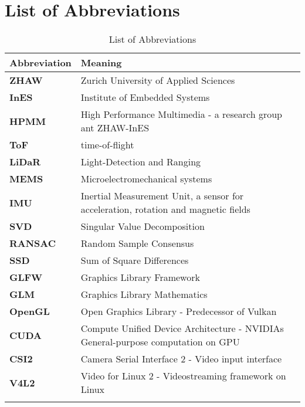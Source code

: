 \chapter*{List of Abbreviations}\label{sec:Glossar}

\begin{longtable}{|m{3cm}|m{11cm}|}	
	\rowcolor{gray} \textbf{Abbreviation}&
	Meaning \\ \hline	
	
	\textbf{ZHAW}&
	Zurich University of Applied Sciences \\ \hline	
	
	\textbf{InES}&
	Institute of Embedded Systems \\ \hline
	
	\textbf{HPMM}&
	High Performance Multimedia - a research group ant ZHAW-InES \\ \hline

	\textbf{ToF}&
	time-of-flight \\ \hline
	
	\textbf{LiDaR}&
	Light-Detection and Ranging \\ \hline	

	\textbf{MEMS}&
	Microelectromechanical systems \\ \hline

	\textbf{IMU}&
	Inertial Measurement Unit, a sensor for acceleration, rotation and magnetic fields \\ \hline	

	\textbf{SVD}&
	Singular Value Decomposition \\ \hline

	\textbf{RANSAC}&
	Random Sample Consensus \\ \hline

	\textbf{SSD}&
	Sum of Square Differences \\ \hline

	\textbf{GLFW}&
	Graphics Library Framework \\ \hline

	\textbf{GLM}&
	Graphics Library Mathematics \\ \hline

	\textbf{OpenGL}&
	Open Graphics Library - Predecessor of Vulkan \\ \hline

	\textbf{CUDA}&
	Compute Unified Device Architecture - NVIDIAs General-purpose computation on GPU\\ \hline	
	
	\textbf{CSI2}&
	Camera Serial Interface 2 - Video input interface\\ \hline

	\textbf{V4L2}&
	Video for Linux 2 - Videostreaming framework on Linux\\ \hline

	\caption{List of Abbreviations}
	\label{tab:glossar}
\end{longtable}%
